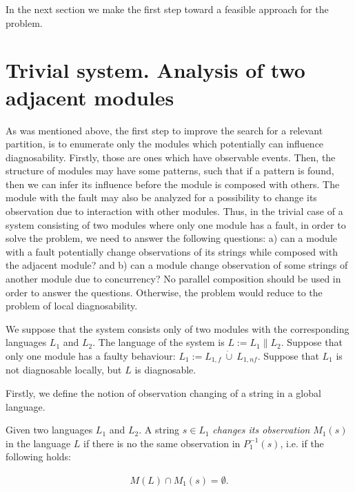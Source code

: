 In the next section we make the first step toward a feasible approach for the
problem.


\section{Trivial system. Analysis of two adjacent modules}

As was mentioned above, the first step to improve the search for a relevant
partition, is to enumerate only the modules which potentially can influence
diagnosability. Firstly, those are ones which have observable events. Then, the
structure of modules may have some patterns, such that if a pattern is found,
then we can infer its influence before the module is composed with others.
The module with the fault may also be analyzed for a possibility to change its
observation due to interaction with other modules. Thus, in the trivial case of
a system consisting of two modules where only one module has a fault, in order
to solve the problem, we need to answer the following questions: a) can a
module with a fault potentially change observations of its strings while
composed with the adjacent module? and b) can a module change observation of
some strings of another module due to concurrency? No parallel composition should be
used in order to answer the questions. Otherwise, the problem would reduce to
the problem of local diagnosability.

We suppose that the system consists only of two modules with the corresponding
languages $L_1$ and $L_2$. The language of the system is $L := L_1 \parallel
L_2$. Suppose that only one module has a faulty behaviour: $L_1 := L_{1,f}
~\dot{\cup}~ L_{1,nf}$.
Suppose that $L_1$ is not diagnosable locally, but $L$ is diagnosable.

Firstly, we define the notion of observation changing of a string in a global
language.
\begin{definition}Given two languages $L_1$ and $L_2$. A string $s \in
L_1$ \emph{changes its observation} $M_1(s)$ in the language $L$ if
there is no the same observation in $P_1^{-1}(s)$, i.e.
if the following holds:
\end{definition}
\begin{equation}
\label{def:obs}
	\begin{array}{l}
		M(L) \cap M_1(s) = \emptyset.
	\end{array}
\end{equation}

